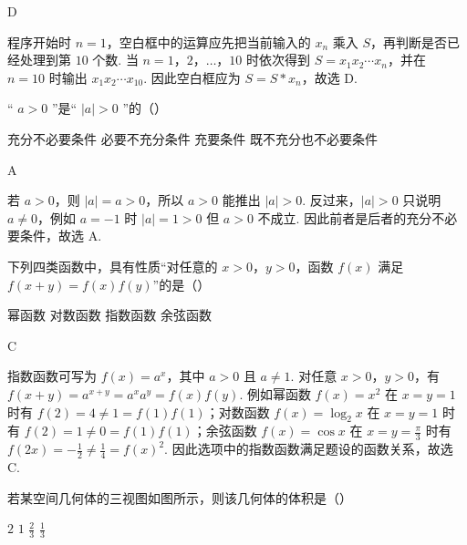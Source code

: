 \begin{answer}
D
\end{answer}

\begin{solution}
程序开始时 \(n=1\)，空白框中的运算应先把当前输入的 \(x_n\) 乘入 \(S\)，再判断是否已经处理到第 \(10\) 个数. 当 \(n=1\)，\(2\)，\(\ldots\)，\(10\) 时依次得到 \(S=x_1x_2\cdots x_n\)，并在 \(n=10\) 时输出 \(x_1x_2\cdots x_{10}\). 因此空白框应为 \(S=S*x_n\)，故选 D.
\end{solution}

\begin{problem}
“ \(a > 0\) ”是“ \(|a| > 0\) ”的（\quad）

\choices
    {充分不必要条件}
    {必要不充分条件}
    {充要条件}
    {既不充分也不必要条件}
\end{problem}

\begin{answer}
A
\end{answer}

\begin{solution}
若 \(a>0\)，则 \(|a|=a>0\)，所以 \(a>0\) 能推出 \(|a|>0\). 反过来，\(|a|>0\) 只说明 \(a\neq0\)，例如 \(a=-1\) 时 \(|a|=1>0\) 但 \(a>0\) 不成立. 因此前者是后者的充分不必要条件，故选 A.
\end{solution}

\begin{problem}
下列四类函数中，具有性质“对任意的 \(x > 0\)，\(y > 0\)，函数 \(f(x)\) 满足 \(f(x + y) = f(x)f(y)\)”的是（\quad）

\choices
    {幂函数}
    {对数函数}
    {指数函数}
    {余弦函数}
\end{problem}

\begin{answer}
C
\end{answer}

\begin{solution}
指数函数可写为 \(f(x)=a^x\)，其中 \(a>0\) 且 \(a\neq1\). 对任意 \(x>0\)，\(y>0\)，有 \(f(x+y)=a^{x+y}=a^xa^y=f(x)f(y)\). 例如幂函数 \(f(x)=x^2\) 在 \(x=y=1\) 时有 \(f(2)=4\neq1=f(1)f(1)\)；对数函数 \(f(x)=\log_2 x\) 在 \(x=y=1\) 时有 \(f(2)=1\neq0=f(1)f(1)\)；余弦函数 \(f(x)=\cos x\) 在 \(x=y=\frac{\pi}{3}\) 时有 \(f(2x)=-\frac12\neq\frac14=f(x)^2\). 因此选项中的指数函数满足题设的函数关系，故选 C.
\end{solution}

\begin{problem}
若某空间几何体的三视图如图所示，则该几何体的体积是（\quad）


\choices
    {\(2\)}
    {\(1\)}
    {\( \frac{2}{3} \)}
    {\( \frac{1}{3} \)}
\end{problem}

